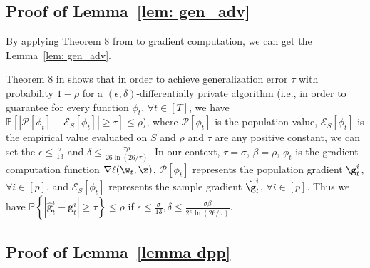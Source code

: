 \subsection{Proof of Lemma~\ref{lem: gen_adv}}
By applying Theorem 8 from \citet{dwfe2015a} to gradient computation, we can get the Lemma~\ref{lem: gen_adv}.

\lemgenadv*

\proof 
Theorem 8 in \citet{dwfe2015a}  shows that in order to achieve generalization error $\tau$ with probability $1-\rho$ for a $(\epsilon, \delta)$-differentially private algorithm (i.e., in order
to guarantee for every function $\phi_t$, $\forall t \in [T]$, we have $\mathbb{P}\left[\left|\mathcal{P}\left[\phi_t\right]-\mathcal{E}_{S}\left[\phi_t\right]\right| \geq \tau\right] \leq \rho$), where $\mathcal{P}\left[\phi_t\right]$ is the population value, $\mathcal{E}_{S}\left[\phi_t\right]$ is the empirical value evaluated on $S$ and $\rho$ and $\tau$ are any positive constant, we can set the $\epsilon \leq \frac{\tau}{13}$ and $\delta \leq \frac{\tau \rho}{26 \ln (26 / \tau)}$. In our context, $\tau = \sigma$, $\beta =\rho$, $\phi_t$ is 
the gradient computation function $\nabla \ell(\w_t,\z)$,  $\mathcal{P}\left[\phi_t\right]$ represents the population gradient $\g_t^i$, $\forall i\in [p]$, and $\mathcal{E}_{S}\left[\phi_t\right]$ represents the sample gradient $\hat \g_t^i$, $\forall i\in [p]$. Thus we have $\mathbb{P}\left\{\left|\hat{\mathbf{g}}_{t}^{i}-\mathbf{g}_{t}^{i}\right| \geq \tau\right\} \leq \rho$ if $\epsilon \leq \frac{\sigma}{13}, \delta \leq \frac{\sigma \beta}{26 \ln (26 / \sigma)}$.

\subsection{Proof of Lemma~\ref{lemma dpp}}


\lemdpp*

